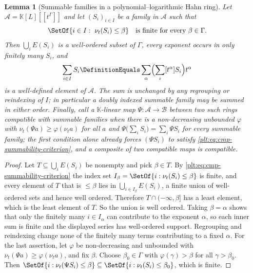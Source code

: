 \documentclass[11pt,oneside]{article}
\theoremstyle{plain}
\newtheorem{lemma}[theorem]{Lemma}
\theoremstyle{definition}
\theoremstyle{remark}
\newcommand{\K}{\mathbb{K}}
\newcommand{\PLlau}{\PolynomialLogLaurentRing{\K}}       %
\newcommand{\ordt}{\nu_{t}}                              %
\begin{document}
\begin{lemma}[Summable families in a polynomial--logarithmic Hahn ring]
\label{plt:lem:cmp-summable}
Let \(\mathcal A=\K[L][[t^\Gamma]]\) and let \((S_i)_{i\in I}\) be a family in
\(\mathcal A\) such that
\begin{equation}\label{plt:eq:cmp-summability-criterion}
 \SetOf{i\in I:\ \ordt(S_i)\le\beta}
 \quad\text{is finite for every }\beta\in\Gamma .
\end{equation}
Then \(\bigcup_iE(S_i)\) is a well-ordered
subset of \(\Gamma\), every exponent occurs in only finitely many \(S_i\), and
\[
 \sum_{i\in I}S_i
 \DefinitionEquals
 \sum_{\alpha}\Bigl(\sum_{i}[t^\alpha]S_i\Bigr)t^\alpha
\]
is a well-defined element of \(\mathcal A\).  The sum is unchanged by any
regrouping or reindexing of \(I\); in particular a doubly indexed summable
family may be summed in either order.  Finally, call a \(\K\)-linear map
\(\Psi:\mathcal A\to\mathcal B\) between two such rings \emph{compatible with
summable families} when there is a non-decreasing unbounded
\(\varphi\) with \(\ordt(\Psi a)\ge\varphi(\ordt a)\) for all \(a\) and
\(\Psi\bigl(\sum_iS_i\bigr)=\sum_i\Psi S_i\) for every summable family; the
first condition alone already forces \((\Psi S_i)\) to satisfy
\eqref{plt:eq:cmp-summability-criterion}, and a composite of two compatible
maps is compatible.
\end{lemma}

\begin{proof}
Let \(T\subseteq\bigcup_iE(S_i)\) be nonempty and pick \(\beta\in T\).  By
\eqref{plt:eq:cmp-summability-criterion} the index set
\(I_\beta=\SetOf{i:\ordt(S_i)\le\beta}\) is finite, and every element of
\(T\) that is \(\le\beta\) lies in \(\bigcup_{i\in I_\beta}E(S_i)\), a finite
union of well-ordered sets and hence well ordered.  Therefore
\(T\cap(-\infty,\beta]\) has a least element, which is the least element of
\(T\).  So the union is well ordered.  Taking \(\beta=\alpha\) shows that only
the finitely many \(i\in I_\alpha\) can contribute to the exponent
\(\alpha\), so each inner sum is finite and the displayed series has
well-ordered support.  Regrouping and reindexing change none of the finitely
many terms contributing to a fixed \(\alpha\).  For the last assertion, let
\(\varphi\) be non-decreasing and unbounded with
\(\ordt(\Psi a)\ge\varphi(\ordt a)\), and fix \(\beta\).  Choose
\(\beta_0\in\Gamma\) with \(\varphi(\gamma)>\beta\) for all
\(\gamma>\beta_0\).  Then
\(\SetOf{i:\ordt(\Psi S_i)\le\beta}\subseteq\SetOf{i:\ordt(S_i)\le\beta_0}\),
which is finite.
\end{proof}
\end{document}
